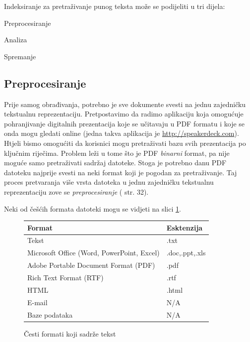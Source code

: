 \documentclass[a4paper,twoside,12pt]{scrreprt}
\begin{document}
Indeksiranje za pretraživanje punog teksta može se podijeliti u tri dijela:

\begin{compactenum}
  \item Preprocesiranje
  \item Analiza
  \item Spremanje
\end{compactenum}

\subsection{Preprocesiranje}

Prije samog obrađivanja, potrebno je sve dokumente svesti na jednu zajedničku tekstualnu reprezentaciju. Pretpostavimo da radimo aplikaciju koja omogućuje pohranjivanje digitalnih prezentacija koje se učitavaju u PDF formatu i koje se onda mogu gledati online (jedna takva aplikacija je \url{http://speakerdeck.com}). Htjeli bismo omogućiti da korisnici mogu pretraživati bazu svih prezentacija po ključnim riječima. Problem leži u tome što je PDF \textit{binarni} format, pa nije moguće samo pretraživati sadržaj datoteke. Stoga je potrebno danu PDF datoteku najprije svesti na neki format koji je pogodan za pretraživanje. Taj proces pretvaranja više vrsta datoteka u jednu zajedničku tekstualnu reprezentaciju zove se \textit{preprocesiranje} (\cite{taming} str. 32).

Neki od češćih formata datoteki mogu se vidjeti na slici \ref{formats}.

{\renewcommand{\arraystretch}{1.2}
\begin{figure}[H]
  \centering
  \begin{tabular}{|l|l|}
    \hline
    \textbf{Format}                            & \textbf{Esktenzija} \\
    \hline
    Tekst                                      & .txt                \\
    \hline
    Microsoft Office (Word, PowerPoint, Excel) & .doc,.ppt,.xls      \\
    \hline
    Adobe Portable Document Format (PDF)       & .pdf                \\
    \hline
    Rich Text Format (RTF)                     & .rtf                \\
    \hline
    HTML                                       & .html               \\
    \hline
    E-mail                                     & N/A                 \\
    \hline
    Baze podataka                              & N/A                 \\
    \hline
  \end{tabular}
  \caption{Česti formati koji sadrže tekst}
  \label{formats}
\end{figure}
}
\end{document}
